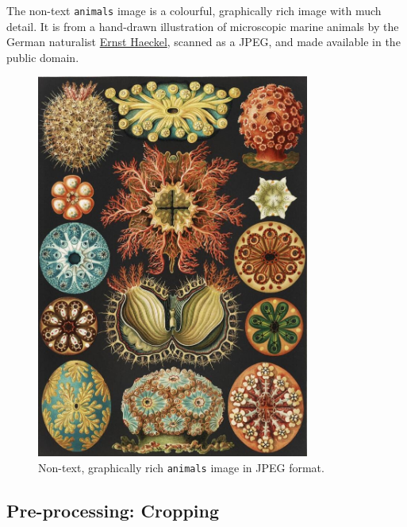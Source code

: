 \documentclass[
  11pt,
  british,
  a4paper,
]{article}
\begin{document}
The non-text \texttt{animals} image is a colourful, graphically rich
image with much detail. It is from a hand-drawn illustration of
microscopic marine animals by the German naturalist
\href{https://en.wikipedia.org/wiki/Ernst_Haeckel}{Ernst Haeckel},
scanned as a JPEG, and made available in the public domain.

\begin{figure}
\hypertarget{fig:animals}{%
\centering
\includegraphics[width=0.8\textwidth,height=\textheight]{images/animals.jpg}
\caption[Non-text, graphically rich \texttt{animals} image in JPEG
format.]{Non-text, graphically rich \texttt{animals} image in JPEG
format.\footnotemark{}}\label{fig:animals}
}
\end{figure}

\hypertarget{pre-processing-cropping}{%
\subsection{Pre-processing: Cropping}\label{pre-processing-cropping}}
\end{document}
